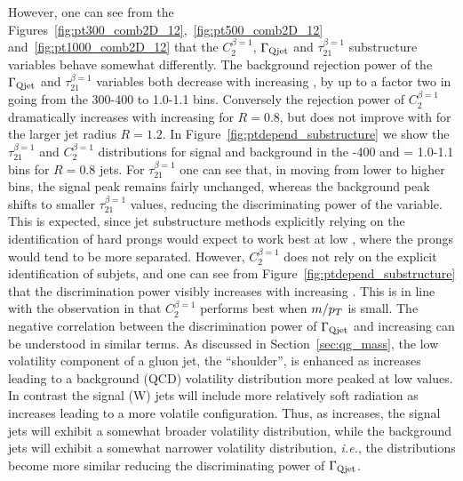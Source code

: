However, one can see from the Figures~\ref{fig:pt300_comb2D_12},~\ref{fig:pt500_comb2D_12}
and~\ref{fig:pt1000_comb2D_12} that the $C_2^{\beta=1}$, $\Gamma_{\rm Qjet}$ and
$\tau_{21}^{\beta=1}$ substructure variables behave somewhat
differently. The background rejection power of the $\Gamma_{\rm Qjet}$ and
$\tau_{21}^{\beta=1}$ variables both decrease with increasing \pt, by
up to a factor two in going from the 300-400 \GeV to
1.0-1.1 \TeV bins. Conversely the rejection power of $C_2^{\beta=1}$
dramatically increases with increasing \pt for $R=0.8$, but does not
improve with \pt for the larger jet radius $R=1.2$. In Figure~\ref{fig:ptdepend_substructure} we show the
$\tau_{21}^{\beta=1}$ and $C_2^{\beta=1}$ distributions for signal and background in the -400 \GeV and \pt = 1.0-1.1 \TeV bins for $R=0.8$ jets. For
$\tau_{21}^{\beta=1}$ one can see that, in moving from  lower to 
higher \pt bins, the signal peak remains fairly unchanged, whereas the
background peak shifts to smaller $\tau_{21}^{\beta=1}$ values,
reducing the discriminating power of the variable. This is expected,
since jet substructure methods explicitly relying on the identification of hard
prongs would expect to work best at low \pt, where the prongs would
tend to be more separated. However, $C_2^{\beta=1}$ does not rely on
the explicit identification of subjets, and one can see from
Figure~\ref{fig:ptdepend_substructure} that the discrimination power
visibly increases with increasing \pt. This is in line with the
observation in \cite{Larkoski:2013eya} that $C_2^{\beta=1}$ performs best when $m/p_T$ is small.
The negative correlation between the discrimination power of $\Gamma_{\rm Qjet}$ and increasing
\pt can be understood in similar terms.  As discussed in Section~\ref{sec:qg_mass}, the low volatility
component of a gluon jet, the ``shoulder'', is enhanced as \pt increases leading to a background (QCD)
volatility distribution more peaked at low values.  In contrast the signal (W) jets will include more relatively soft 
radiation as \pt increases leading to a more volatile configuration. 
Thus, as \pt increases, the signal jets will exhibit a somewhat broader volatility distribution, while
the background jets will exhibit a somewhat narrower volatility distribution, \textit{i.e.}, the
distributions become more similar reducing the discriminating power of $\Gamma_{\rm Qjet}$. 

